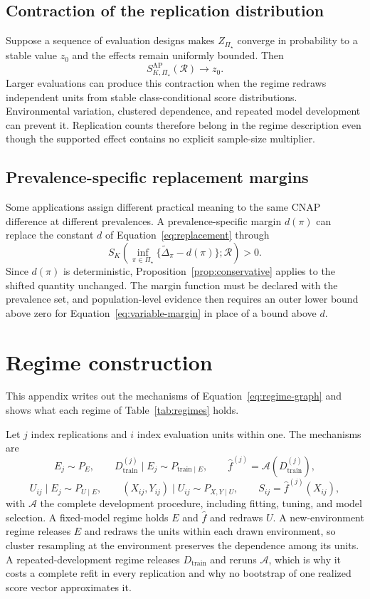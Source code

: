 \documentclass[11pt]{article}
\newcommand{\Regime}{\mathcal{R}}
\newcommand{\PSet}{\Pi_\star}
\newcommand{\Dta}{\widetilde{\Delta}}
\theoremstyle{remark}
\begin{document}
\subsection{Contraction of the replication distribution}

Suppose a sequence of evaluation designs makes $Z_{\PSet}$ converge in probability to a stable value $z_0$ and the effects remain uniformly bounded. Then
\[
S_{K,\PSet}^{\mathrm{AP}}(\Regime)
\longrightarrow
z_0.
\]
Larger evaluations can produce this contraction when the regime redraws independent units from stable class-conditional score distributions. Environmental variation, clustered dependence, and repeated model development can prevent it. Replication counts therefore belong in the regime description even though the supported effect contains no explicit sample-size multiplier.

\subsection{Prevalence-specific replacement margins}
\label{app:variable-margin}

Some applications assign different practical meaning to the same CNAP difference at different prevalences. A prevalence-specific margin $d(\pi)$ can replace the constant $d$ of Equation~\eqref{eq:replacement} through
\begin{equation}
S_K\left(
\inf_{\pi\in\PSet}
\{\Dta_\pi-d(\pi)\};
\Regime
\right)>0.
\label{eq:variable-margin}
\end{equation}
Since $d(\pi)$ is deterministic, Proposition~\ref{prop:conservative} applies to the shifted quantity unchanged. The margin function must be declared with the prevalence set, and population-level evidence then requires an outer lower bound above zero for Equation~\eqref{eq:variable-margin} in place of a bound above $d$.


\section{Regime construction}
\label{app:regime}

This appendix writes out the mechanisms of Equation~\eqref{eq:regime-graph} and shows what each regime of Table~\ref{tab:regimes} holds.

Let $j$ index replications and $i$ index evaluation units within one. The mechanisms are
\[
E_j\sim P_E,
\qquad
D_{\mathrm{train}}^{(j)}\mid E_j\sim P_{\mathrm{train}\mid E},
\qquad
\widehat f^{(j)}=\mathcal{A}\!\left(D_{\mathrm{train}}^{(j)}\right),
\]
\[
U_{ij}\mid E_j\sim P_{U\mid E},
\qquad
(X_{ij},Y_{ij})\mid U_{ij}\sim P_{X,Y\mid U},
\qquad
S_{ij}=\widehat f^{(j)}(X_{ij}),
\]
with $\mathcal{A}$ the complete development procedure, including fitting, tuning, and model selection. A fixed-model regime holds $E$ and $\widehat f$ and redraws $U$. A new-environment regime releases $E$ and redraws the units within each drawn environment, so cluster resampling at the environment preserves the dependence among its units. A repeated-development regime releases $D_{\mathrm{train}}$ and reruns $\mathcal{A}$, which is why it costs a complete refit in every replication and why no bootstrap of one realized score vector approximates it.
\end{document}
